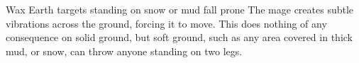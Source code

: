   {}%
  {Wax}%
  {Earth}%
  {}%
  {targets standing on snow or mud fall prone}%
  {
    The mage creates subtle vibrations across the ground, forcing it to move.
    This does nothing of any consequence on solid ground, but soft ground, such as any area covered in thick mud, or snow, can throw anyone standing on two legs.
  }


